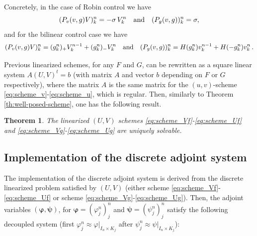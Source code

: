 \documentclass[11pt]{article}
\newtheorem{theorem}{Theorem}[]
\numberwithin{theorem}{section}
\begin{document}
Concretely, in the case of 
Robin control we have
$$(P_v(v,g)V)^n_k=-\sigma\, V^n_k\quad \hbox{and}  \quad (P_g(v,g))^n_k=\sigma,
$$
 and for the bilinear control case we have
$$(P_v(v,g)V)^n_k= (g^n_k)_+ V^{n-1}_k + (g^n_k)_- V^{n}_k 
\quad \hbox{and}  \quad (P_g(v,g))^n_k= H(g^n_k) v^{n-1}_k  + H(-g^n_k) v^{n}_k \,.
$$

Previous linearized schemes, for any $F$ and $G$, can be rewritten as a square linear system $A (U,V)^t=b$ (with matrix $A$ and vector $b$  depending on $F$ or $G$ respectively), where the matrix $A$ is the same matrix for the $(u,v)$-scheme \eqref{eq:scheme_v}-\eqref{eq:scheme_u}, which is regular. Then, similarly to Theorem \ref{th:well-posed-scheme}, one has the following result.

\begin{theorem}
The  linearized $(U,V)$ schemes \eqref{eq:scheme_Vf}-\eqref{eq:scheme_Uf} and \eqref{eq:scheme_Vg}-\eqref{eq:scheme_Ug}
are uniquely solvable.
\end{theorem}

%


\subsection{Implementation of the discrete adjoint system}

The implementation of the discrete adjoint system is derived from the  discrete linearized problem satisfied by $(U,V)$ (either scheme \eqref{eq:scheme_Vf}-\eqref{eq:scheme_Uf} or scheme \eqref{eq:scheme_Vg}-\eqref{eq:scheme_Ug}). Then, the adjoint variables 
  $(\boldsymbol{\varphi},\boldsymbol{\psi})$, for $\boldsymbol{\varphi}=(\varphi_j^n)_j^n$ and $\boldsymbol{\psi}=(\psi_j^n)_j^n$ satisfy the following decoupled system (first $\varphi^n_j \approx \varphi |_{I_n\times K_j}$ after $\psi^n_j \approx \psi |_{I_n\times K_j}$):
\end{document}
